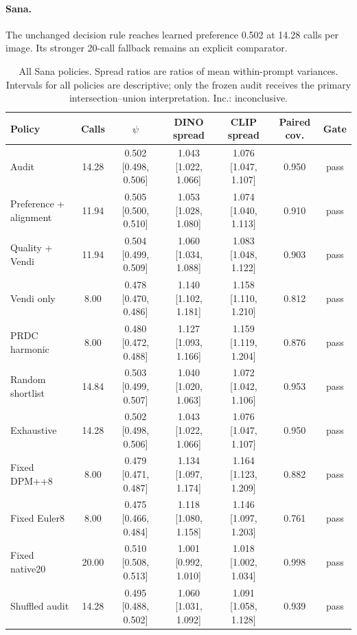 \paragraph{Sana.}
The unchanged decision rule reaches learned preference 0.502 at 14.28 calls
per image. Its stronger 20-call fallback remains an explicit comparator.
\begin{table}[t]\centering\small
\caption{All Sana policies. Spread ratios are ratios of mean within-prompt variances. Intervals for all policies are descriptive; only the frozen audit receives the primary intersection--union interpretation. Inc.: inconclusive.}
\begin{tabular}{lcccccc}\toprule
Policy & Calls & $\psi$ & DINO spread & CLIP spread & Paired cov. & Gate \\\midrule
Audit & 14.28 & 0.502 [0.498, 0.506] & 1.043 [1.022, 1.066] & 1.076 [1.047, 1.107] & 0.950 & pass \\
Preference + alignment & 11.94 & 0.505 [0.500, 0.510] & 1.053 [1.028, 1.080] & 1.074 [1.040, 1.113] & 0.910 & pass \\
Quality + Vendi & 11.94 & 0.504 [0.499, 0.509] & 1.060 [1.034, 1.088] & 1.083 [1.048, 1.122] & 0.903 & pass \\
Vendi only & 8.00 & 0.478 [0.470, 0.486] & 1.140 [1.102, 1.181] & 1.158 [1.110, 1.210] & 0.812 & pass \\
PRDC harmonic & 8.00 & 0.480 [0.472, 0.488] & 1.127 [1.093, 1.166] & 1.159 [1.119, 1.204] & 0.876 & pass \\
Random shortlist & 14.84 & 0.503 [0.499, 0.507] & 1.040 [1.020, 1.063] & 1.072 [1.042, 1.106] & 0.953 & pass \\
Exhaustive & 14.28 & 0.502 [0.498, 0.506] & 1.043 [1.022, 1.066] & 1.076 [1.047, 1.107] & 0.950 & pass \\
Fixed DPM++8 & 8.00 & 0.479 [0.471, 0.487] & 1.134 [1.097, 1.174] & 1.164 [1.123, 1.209] & 0.882 & pass \\
Fixed Euler8 & 8.00 & 0.475 [0.466, 0.484] & 1.118 [1.080, 1.158] & 1.146 [1.097, 1.203] & 0.761 & pass \\
Fixed native20 & 20.00 & 0.510 [0.508, 0.513] & 1.001 [0.992, 1.010] & 1.018 [1.002, 1.034] & 0.998 & pass \\
Shuffled audit & 14.28 & 0.495 [0.488, 0.502] & 1.060 [1.031, 1.092] & 1.091 [1.058, 1.128] & 0.939 & pass \\
\bottomrule\end{tabular}\end{table}
